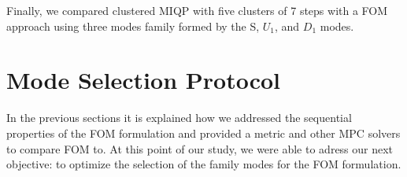 \documentclass[12,twoside]{TFG-GM}
\theoremstyle{definition}
\theoremstyle{remark}
\begin{document}
\begin{minipage}{\linewidth}
 \label{fig:general_trajectory_frank_modes_long_horizon}
\end{minipage}
\begin{minipage}{\textwidth}
\label{fig:original_general_trajectory_short_horizon}        
\end{minipage}

Finally, we compared clustered MIQP with five clusters of 7 steps with a FOM approach using three modes family formed by the S, $U_1$, and $D_1$ modes. 


\newpage

\section{Mode Selection Protocol}
\label{sec:modeselection}
In the previous sections it is explained how we addressed the sequential properties of the FOM formulation and provided a metric and other MPC solvers to compare FOM to. At this point of our study, we were able to adress our next objective: to optimize the selection of the family modes for the FOM formulation.
\end{document}
